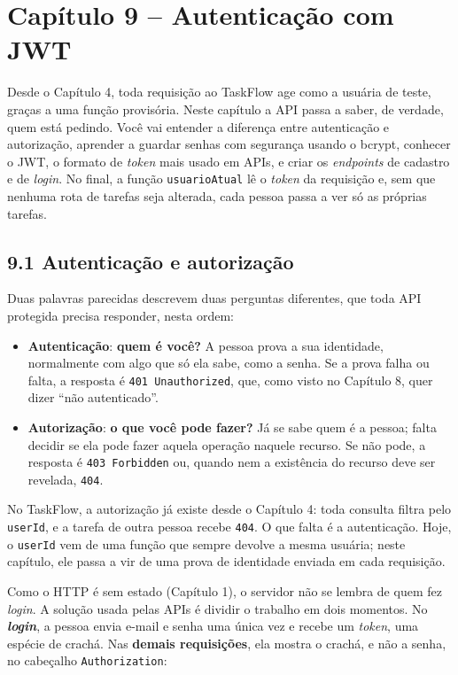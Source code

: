 \section{Capítulo 9 -- Autenticação com JWT}

Desde o Capítulo 4, toda requisição ao TaskFlow age como a usuária de teste, graças a uma função provisória. Neste capítulo a API passa a saber, de verdade, quem está pedindo. Você vai entender a diferença entre autenticação e autorização, aprender a guardar senhas com segurança usando o bcrypt, conhecer o JWT, o formato de \textit{token} mais usado em APIs, e criar os \textit{endpoints} de cadastro e de \textit{login}. No final, a função \texttt{usuarioAtual} lê o \textit{token} da requisição e, sem que nenhuma rota de tarefas seja alterada, cada pessoa passa a ver só as próprias tarefas.

\subsection{9.1 Autenticação e autorização}

Duas palavras parecidas descrevem duas perguntas diferentes, que toda API protegida precisa responder, nesta ordem:

\begin{itemize}
  \item \textbf{Autenticação}: \textbf{quem é você?} A pessoa prova a sua identidade, normalmente com algo que só ela sabe, como a senha. Se a prova falha ou falta, a resposta é \texttt{401 Unauthorized}, que, como visto no Capítulo 8, quer dizer ``não autenticado''.
  \item \textbf{Autorização}: \textbf{o que você pode fazer?} Já se sabe quem é a pessoa; falta decidir se ela pode fazer aquela operação naquele recurso. Se não pode, a resposta é \texttt{403 Forbidden} ou, quando nem a existência do recurso deve ser revelada, \texttt{404}.
\end{itemize}

No TaskFlow, a autorização já existe desde o Capítulo 4: toda consulta filtra pelo \texttt{userId}, e a tarefa de outra pessoa recebe \texttt{404}. O que falta é a autenticação. Hoje, o \texttt{userId} vem de uma função que sempre devolve a mesma usuária; neste capítulo, ele passa a vir de uma prova de identidade enviada em cada requisição.

Como o HTTP é sem estado (Capítulo 1), o servidor não se lembra de quem fez \textit{login}. A solução usada pelas APIs é dividir o trabalho em dois momentos. No \textbf{\textit{login}}, a pessoa envia e-mail e senha uma única vez e recebe um \textit{token}, uma espécie de crachá. Nas \textbf{demais requisições}, ela mostra o crachá, e não a senha, no cabeçalho \texttt{Authorization}:

